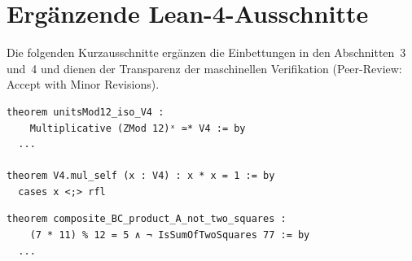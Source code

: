 \documentclass[11pt,a4paper]{article}
\theoremstyle{definition}
\begin{document}
	\appendix
	\section{Ergänzende Lean-4-Ausschnitte}
	Die folgenden Kurzausschnitte ergänzen die Einbettungen in den Abschnitten~3 und~4 und dienen der Transparenz der maschinellen Verifikation (Peer-Review: Accept with Minor Revisions).

	\begin{lstlisting}[caption={Isomorphismus und Exponent-2-Gesetz}]
theorem unitsMod12_iso_V4 :
    Multiplicative (ZMod 12)ˣ ≃* V4 := by
  ...

theorem V4.mul_self (x : V4) : x * x = 1 := by
  cases x <;> rfl
	\end{lstlisting}

	\begin{lstlisting}[caption={Semiprim $B\cdot C\to A$ ohne Zwei-Quadrate-Darstellung}]
theorem composite_BC_product_A_not_two_squares :
    (7 * 11) % 12 = 5 ∧ ¬ IsSumOfTwoSquares 77 := by
  ...
	\end{lstlisting}
	
\end{document}
